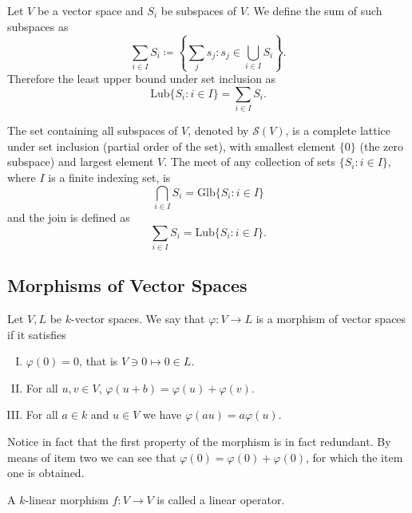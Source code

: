 \begin{definition}\label{def: sum of subspaces}
Let \(V\) be a vector space and \(S_i\) be subspaces of \(V\). We define the
sum of such subspaces as
\[
  \sum_{i \in I} S_i \coloneq \left\{\sum_j s_j \colon s_j \in \bigcup_{i \in  I}
  S_i\right\}.
\]
Therefore the least upper bound under set inclusion as
\[
  \mathrm{Lub}\{S_i \colon i \in I\} = \sum_{i \in I} S_i.
\]
\end{definition}

\begin{theorem}
\label{thm: subspaces form a lattice}
The set containing all subspaces of \(V\), denoted by \(\mathcal{S}(V)\), is
a complete lattice under set inclusion (partial order of the set), with
smallest element \(\{0\}\) (the zero subspace) and largest element \(V\). The
meet of any collection of sets \(\{S_i \colon i \in I\}\), where \(I\) is a finite
indexing set, is
\[
  \bigcap_{i \in  I} S_i = \mathrm{Glb}\{S_i \colon i \in I\}
\]
and the join is defined as
\[
  \sum_{i \in I} S_i = \mathrm{Lub}\{S_i \colon i \in I\}.
\]
\end{theorem}

\subsection{Morphisms of Vector Spaces}

\begin{definition}[Morphisms]\label{def: k-linear morphism}
Let \(V, L\) be \(k\)-vector spaces. We say that \(\varphi : V \to L\) is a
morphism of vector spaces if it satisfies
\begin{enumerate}[I.]
  \item \(\varphi(0) = 0\), that is \(V \ni 0 \mapsto 0 \in L\).
  \item For all \(u, v \in V\), \(\varphi(u + b) = \varphi(u) +
      \varphi(v)\).
  \item For all \(a \in k\) and \(u \in V\) we have \(\varphi(au) =
      a\varphi(u)\).
\end{enumerate}
\end{definition}

Notice in fact that the first property of the morphism is in fact redundant. By
means of item two we can see that \(\varphi(0) = \varphi(0) + \varphi(0)\), for
which the item one is obtained.

\begin{definition}\label{def: linear operator}
A \(k\)-linear morphism \(f : V \to V\) is called a linear operator.
\end{definition}

